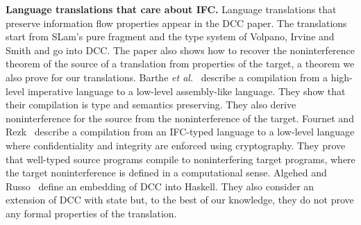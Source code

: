 \medskip \noindent \textbf{Language translations that care about IFC.}
Language translations that preserve information flow properties appear
in the DCC paper. The translations start from SLam's pure fragment and
the type system of Volpano, Irvine and Smith and go into DCC. The
paper also shows how to recover the noninterference theorem of the
source of a translation from properties of the target, a theorem we
also prove for our translations.
%
Barthe \emph{et al.}~\cite{DBLP:journals/cl/BartheRB07} describe a
compilation from a high-level imperative language to a low-level
assembly-like language. They show that their compilation is type and
semantics preserving. They also derive noninterference for the source
from the noninterference of the target.
%
Fournet and
Rezk~\cite{popl08-cryptoIFC} describe a compilation from an IFC-typed
language to a low-level language where confidentiality and integrity
are enforced using cryptography. They prove that well-typed source
programs compile to noninterfering target programs, where the target
noninterference is defined in a computational sense.
%
Algehed and Russo~\cite{plas17-DCCinHaskell} define an embedding of
DCC into Haskell. They also consider an extension of DCC with state
but, to the best of our knowledge, they do not prove any formal
properties of the translation.









